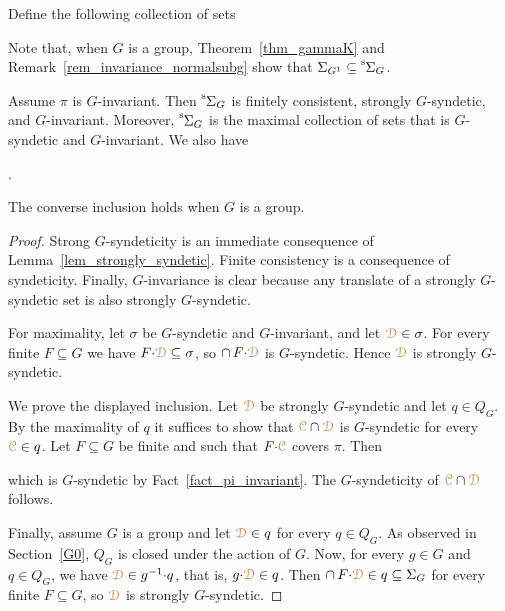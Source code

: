 Define the following collection of sets

\smallskip

Note that, when $G$ is a group, Theorem~\ref{thm_gammaK} and Remark~\ref{rem_invariance_normalsubg} show that $\Sigma_{G^1}\subseteq{\mathstrut}^{\rm s}\kern-.1ex\Sigma_G$.

\begin{corollary}\label{corol_str_gen}
  Assume $\pi$ is $G$-invariant.
  Then ${\mathstrut}^{\rm s}\kern-.1ex\Sigma_G$ is finitely consistent, strongly $G$-syndetic, and $G$-invariant.
  Moreover, ${\mathstrut}^{\rm s}\kern-.1ex\Sigma_G$ is the maximal collection of sets that is $G$-syndetic and $G$-invariant.
  We also have\medskip

  .\smallskip

  The converse inclusion holds when $G$ is a group.
\end{corollary}

\begin{proof}
  Strong $G$-syndeticity is an immediate consequence of Lemma~\ref{lem_strongly_syndetic}.
  Finite consistency is a consequence of syndeticity.
  Finally, $G$-invariance is clear because any translate of a strongly $G$-syndetic set is also strongly $G$-syndetic.

  For maximality, let $\sigma$ be $G$-syndetic and $G$-invariant, and let ${\color{brown}\EuScript D}\in\sigma$.
  For every finite $F\subseteq G$ we have $F{\cdot}{\color{brown}\EuScript D}\subseteq\sigma$, so $\cap\,F{\cdot}{\color{brown}\EuScript D}$ is $G$-syndetic.
  Hence ${\color{brown}\EuScript D}$ is strongly $G$-syndetic.

  We prove the displayed inclusion.
  Let ${\color{brown}\EuScript D}$ be strongly $G$-syndetic and let $q\in Q_G$.
  By the maximality of $q$ it suffices to show that ${\color{brown}\EuScript C}\cap{\color{brown}\EuScript D}$ is $G$-syndetic for every ${\color{brown}\EuScript C}\in q$.
  Let $F\subseteq G$ be finite and such that $F{\cdot}{\color{brown}\EuScript C}$ covers $\pi$.
  Then 
  
  
  which is $G$-syndetic by Fact~\ref{fact_pi_invariant}.
  The $G$-syndeticity of ${\color{brown}\EuScript C}\cap{\color{brown}\EuScript D}$ follows.

  Finally, assume $G$ is a group and let ${\color{brown}\EuScript D}\in q$ for every $q\in Q_G$.
  As observed in Section~\ref{G0}, $Q_G$ is closed under the action of $G$.
  Now, for every $g\in G$ and $q\in Q_G$, we have ${\color{brown}\EuScript D}\in g^{-1}{\cdot}q$, that is, $g{\cdot}{\color{brown}\EuScript D}\in q$.
  Then $\cap\,F{\cdot}{\color{brown}\EuScript D}\in q\subseteq\Sigma_G$ for every finite $F\subseteq G$, so ${\color{brown}\EuScript D}$ is strongly $G$-syndetic.
\end{proof}

